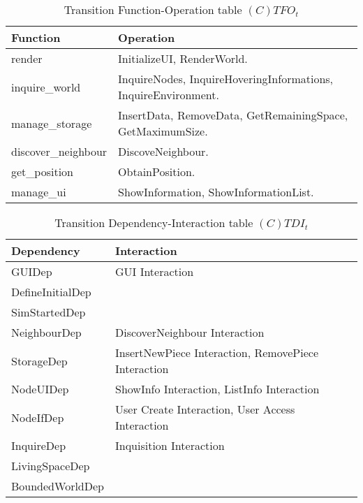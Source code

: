 \begin{table}[H]
	\centering
	\begin{tabular}{|p{4cm}|p{8cm}|}
			\hline
			\textbf{Function} & \textbf{Operation} \\
			\hline
			render & InitializeUI, RenderWorld. \\
			\hline
			inquire\_world & InquireNodes, InquireHoveringInformations, InquireEnvironment. \\
			\hline
			manage\_storage & InsertData, RemoveData, GetRemainingSpace,
			GetMaximumSize. \\
			\hline
			discover\_neighbour & DiscoveNeighbour. \\
			\hline
			get\_position & ObtainPosition. \\
			\hline
			manage\_ui & ShowInformation, ShowInformationList. \\
			\hline
		\end{tabular}
	\caption{Transition Function-Operation table $(C)TFO_t$}
	\label{tab:ctfot}
\end{table}

\begin{table}[H]
	\centering
	\begin{tabular}{|p{4cm}|p{8cm}|}
			\hline
			\textbf{Dependency} & \textbf{Interaction} \\
			\hline
			GUIDep & GUI Interaction \\
			\hline
			DefineInitialDep & \\
			\hline
			SimStartedDep & \\
			\hline
			NeighbourDep & DiscoverNeighbour Interaction\\
			\hline
			StorageDep & InsertNewPiece Interaction, RemovePiece Interaction \\
			\hline
			NodeUIDep & ShowInfo Interaction, ListInfo Interaction \\
			\hline
			NodeIfDep & User Create Interaction, User Access Interaction \\
			\hline
			InquireDep & Inquisition Interaction\\
			\hline
			LivingSpaceDep & \\
			\hline
			BoundedWorldDep & \\
			\hline
		\end{tabular}
	\caption{Transition Dependency-Interaction table $(C)TDI_t$}
	\label{tab:ctdit}
\end{table}

